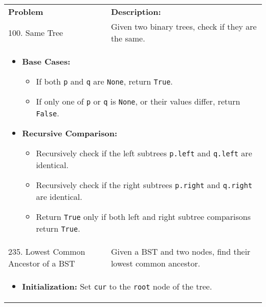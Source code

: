 \begin{summary}
    \begin{center}
        \begin{tabular}{ll}
            \toprule
            \textbf{Problem} & \textbf{Description:} \\
            100. Same Tree & Given two binary trees, check if they are the same. \\
            \multicolumn{2}{p{\linewidth}}{
                \begin{itemize}
                    \item \textbf{Base Cases:}
                    \begin{itemize}
                        \item If both \texttt{p} and \texttt{q} are \texttt{None}, return \texttt{True}.
                        \item If only one of \texttt{p} or \texttt{q} is \texttt{None}, or their values differ, return \texttt{False}.
                    \end{itemize}
                
                    \item \textbf{Recursive Comparison:}
                    \begin{itemize}
                        \item Recursively check if the left subtrees \texttt{p.left} and \texttt{q.left} are identical.
                        \item Recursively check if the right subtrees \texttt{p.right} and \texttt{q.right} are identical.
                        \item Return \texttt{True} only if both left and right subtree comparisons return \texttt{True}.
                    \end{itemize}
                \end{itemize}                
            } \\
            \midrule
            235. Lowest Common Ancestor of a BST & Given a BST and two nodes, find their lowest common ancestor. \\
            \multicolumn{2}{p{\linewidth}}{
                \begin{itemize}
                    \item \textbf{Initialization:} Set \texttt{cur} to the \texttt{root} node of the tree.
                

\end{itemize}}
\end{tabular}
\end{center}
\end{summary}
